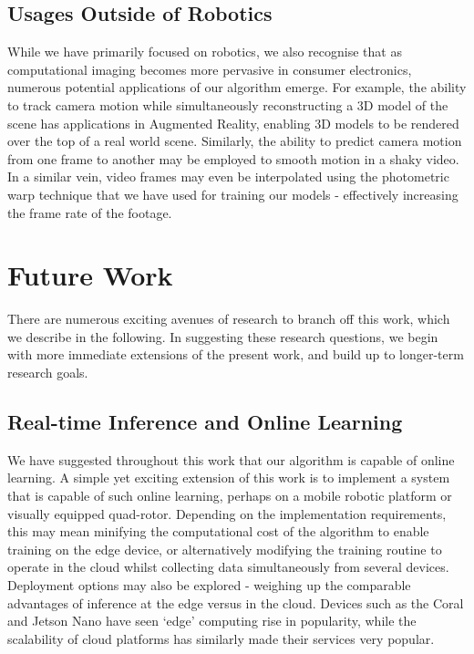 \subsection{Usages Outside of Robotics}
While we have primarily focused on robotics, we also recognise that as computational imaging becomes more pervasive in consumer electronics, numerous potential applications of our algorithm emerge. For example, the ability to track camera motion while simultaneously reconstructing a 3D model of the scene has applications in Augmented Reality, enabling 3D models to be rendered over the top of a real world scene. Similarly, the ability to predict camera motion from one frame to another may be employed to smooth motion in a shaky video. In a similar vein, video frames may even be interpolated using the photometric warp technique that we have used for training our models - effectively increasing the frame rate of the footage.

\section{Future Work}

There are numerous exciting avenues of research to branch off this work, which we describe in the following. In suggesting these research questions, we begin with more immediate extensions of the present work, and build up to longer-term research goals. 

\subsection{Real-time Inference and Online Learning}
We have suggested throughout this work that our algorithm is capable of online learning. A simple yet exciting extension of this work is to implement a system that is capable of such online learning, perhaps on a mobile robotic platform or visually equipped quad-rotor. Depending on the implementation requirements, this may mean minifying the computational cost of the algorithm to enable training on the edge device, or alternatively modifying the training routine to operate in the cloud whilst collecting data simultaneously from several devices. Deployment options may also be explored - weighing up the comparable advantages of inference at the edge versus in the cloud. Devices such as the Coral and Jetson Nano have seen `edge' computing rise in popularity, while the scalability of cloud platforms has similarly made their services very popular. 

